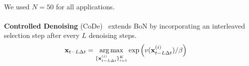 \\ 
We used $N=50$ for all applications. 
\\
\\
\textbf{Controlled Denoising} (CoDe)~\cite{Singh:2025CoDE} extends BoN by incorporating an interleaved selection step after every $L$ denoising steps. 
\begin{align}
    \nonumber
    \B{x}_{t-L\Delta t} &= \argmax_{\{ \B{x}^{(i)}_{t-L\Delta t} \}_{i=1}^{K} } \exp\left(v(\B{x}^{(i)}_{t-L\Delta t})/\beta\right) %
\end{align}

